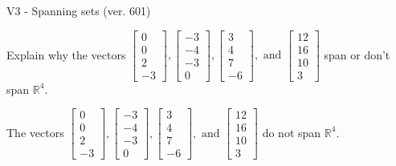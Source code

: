 \begin{exercise}
  \begin{exerciseTitle}V3 - Spanning sets (ver. 601)\end{exerciseTitle}
  \begin{exerciseStatement}
    Explain why the vectors \(\left[\begin{array}{r}
0 \\
0 \\
2 \\
-3
\end{array}\right] , \left[\begin{array}{r}
-3 \\
-4 \\
-3 \\
0
\end{array}\right] , \left[\begin{array}{r}
3 \\
4 \\
7 \\
-6
\end{array}\right] , \text{ and } \left[\begin{array}{r}
12 \\
16 \\
10 \\
3
\end{array}\right]\) span or don't span \(\mathbb{R}^4\). 
	


  \end{exerciseStatement}
  \begin{exerciseAnswer}
   The vectors \(\left[\begin{array}{r}
0 \\
0 \\
2 \\
-3
\end{array}\right] , \left[\begin{array}{r}
-3 \\
-4 \\
-3 \\
0
\end{array}\right] , \left[\begin{array}{r}
3 \\
4 \\
7 \\
-6
\end{array}\right] , \text{ and } \left[\begin{array}{r}
12 \\
16 \\
10 \\
3
\end{array}\right]\) 
  	 do not  
	span \(\mathbb{R}^4\).
  


  \end{exerciseAnswer}
\end{exercise}